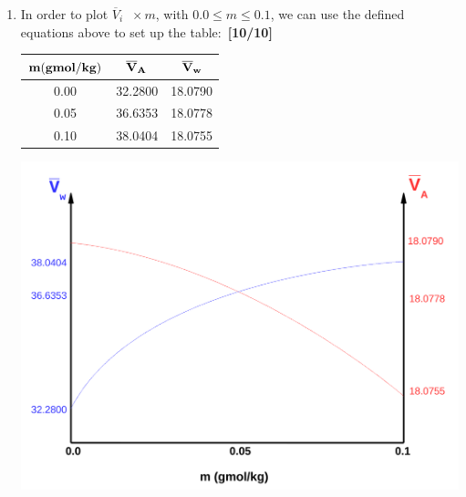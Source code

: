 \documentclass[12pts,a4paper,amsmath,amssymb,floatfix]{article}%
\renewcommand\leq{\leqslant}
\newcommand{\frc}{\displaystyle\frac}
\newcommand{\blue}{\textcolor{blue}}
\begin{document}
\begin{enumerate}[label=\bfseries Problem \arabic*]
{\begin{enumerate}
       From the definition of molality, i.e., number of moles of K$_{2}$SO$_{4}$ per kg of water,~\hfill{\bf [1/15]}
       \begin{displaymath}
           m = \frc{n_{A}}{n_{w}M_{w}} \Longrightarrow m\cdot M_{w} = \frc{n_{A}}{n_{w}},
       \end{displaymath}
       where $n_{A}$, $n_{w}$ are the number of moles of K$_{2}$SO$_{4}$ and water, respectively. $M_{w}$ is the molar mass of water.  Replacing in Eqn.~\ref{example4:eqn1}, ~\hfill{\bf [6/15]}
      \begin{eqnarray}
         \overline{V}_{w} - V_{w}^{\circ} &=& -\int\limits_{0}^{m} m\cdot M_{w} \frc{1}{2}\cdot 18.216 m^{-1/2} dm \nonumber \\
                                       &=& -9.108\; M_{w} \left. \frc{2}{3} m^{3/2}\right|_{0}^{m} \nonumber \\
         \blue{\left(\text{where }\right.}&& \blue{\left. M_{w} = 18 \frc{kg}{kgmol} = 0.018 \frc{kg}{gmol}\right)} \nonumber \\
         {\bf \overline{V}_{w}} &=& {\bf 18.079 - 0.1093 m^{3/2}} \nonumber 
      \end{eqnarray}
  \item In order to plot $\overline{V}_{i}\;\;\times m$, with $0.0\leq m\leq 0.1$, we can use the defined equations above to set  up the table:~\hfill{\bf [10/10]}
        \begin{center}
          \begin{tabular}{|c | c c |}
            \hline
            ${\bf m (gmol/kg)}$ & ${\bf \overline{V}_{A}}$ & ${\bf \overline{V}_{w}}$ \\
            \hline
              0.00  & 32.2800 &  18.0790 \\
              0.05  & 36.6353 &  18.0778 \\
              0.10  & 38.0404 &  18.0755 \\
             \hline
          \end{tabular}
        \end{center}
          \begin{center}
              \includegraphics[width=0.75\columnwidth,clip]{./Pics/Example04_Pic}
          \end{center}
\end{enumerate}
}
\end{enumerate} 
\end{document}
